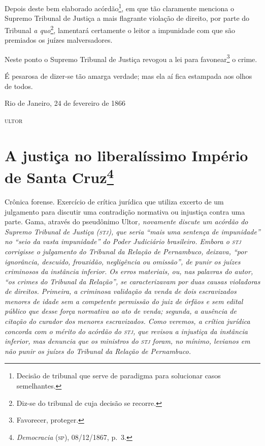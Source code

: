 Depois deste bem elaborado acórdão\footnote{Decisão de tribunal que
  serve de paradigma para solucionar casos semelhantes.}, em que tão
claramente menciona o Supremo Tribunal de Justiça a mais flagrante
violação de direito, por parte do Tribunal \emph{a quo}\footnote{
  Diz-se do tribunal de cuja decisão se recorre.}, lamentará certamente
o leitor a impunidade com que são premiados os juízes malversadores.

Neste ponto o Supremo Tribunal de Justiça revogou a lei para
favonear\footnote{Favorecer, proteger.} o crime.

É pesarosa de dizer-se tão amarga verdade; mas ela aí fica estampada aos
olhos de todos.

\begin{flushright}
Rio de Janeiro, 24 de fevereiro de 1866

\textsc{ultor}
\end{flushright}

\chapter{A justiça no liberalíssimo Império de Santa Cruz\footnote{\emph{Democracia} (\textsc{sp}), 08/12/1867, p.~3.}}

\begin{didascalia}
Crônica forense. Exercício de crítica jurídica que utiliza excerto de um
julgamento para discutir uma contradição normativa ou injustiça contra
uma parte. Gama, através do pseudônimo Ultor\emph{, novamente discute
um acórdão do Supremo Tribunal de Justiça (\textsc{stj}), que seria ``mais uma
sentença de impunidade'' no ``seio da vasta impunidade'' do Poder
Judiciário brasileiro. Embora o \textsc{stj} corrigisse o julgamento do Tribunal
da Relação de Pernambuco, deixava, ``por ignorância, descuido, frouxidão,
negligência ou omissão'', de punir os juízes criminosos da instância
inferior. Os erros materiais, ou, nas palavras do autor, ``os crimes do
Tribunal da Relação'', se caracterizavam por duas causas violadoras de
direitos. Primeira, a criminosa validação da venda de dois escravizados
menores de idade sem a competente permissão do juiz de órfãos e sem
edital público que desse força normativa ao ato de venda; segunda, a
ausência de citação do curador dos menores escravizados. Como veremos, a
crítica jurídica concorda com o mérito do acórdão do \textsc{stj}, que revisou a
injustiça da instância inferior, mas denuncia que os ministros do \textsc{stj}
foram, no mínimo, levianos em não punir os juízes do Tribunal da Relação
de Pernambuco.}
\end{didascalia}



